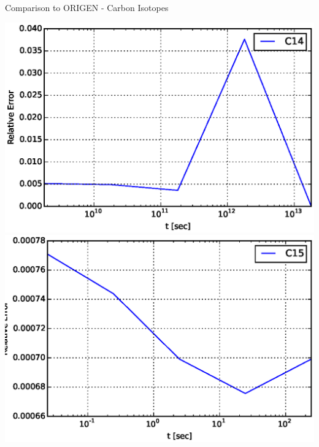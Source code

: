 \documentclass[xcolor=x11names,compress]{beamer}
\begin{document}
\begin{frame}{Comparison to ORIGEN - Carbon Isotopes}
    \vspace*{-2.5em}
    \begin{center}
    \includegraphics[scale=0.4]{decay-relative-error-C14.eps}
    \includegraphics[scale=0.4]{decay-relative-error-C15.eps}
    \end{center}

\end{frame}

\end{document}
